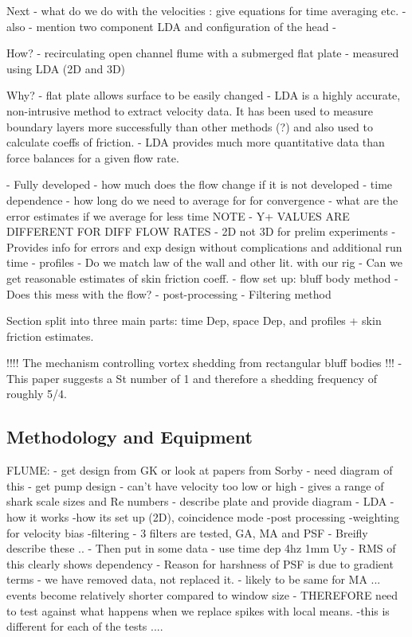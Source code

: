 \documentclass[12pt,oneside,a4paper]{article}
\begin{document}
Next - what do we do with the velocities : give equations for time averaging etc.
	-	also - mention two component LDA and configuration of the head
	-	




\vspace{2cm}

How?
	-	recirculating open channel flume with a submerged flat plate
	-	measured using LDA (2D and 3D)

Why?
	-	flat plate allows surface to be easily changed
	-	LDA is a highly accurate, non-intrusive method to extract 
		velocity data. It has been used to measure boundary layers 
		more successfully than other methods (?) and also used to 
		calculate coeffs of friction.
	-	LDA provides much more quantitative data than force balances
		for a given flow rate.



-	Fully developed
		-	how much does the flow change if it is not developed
-	time dependence
		-	how long do we need to average for for convergence
		-	what are the error estimates if we average for less time
			NOTE - Y+ VALUES ARE DIFFERENT FOR DIFF FLOW RATES
-	2D not 3D for prelim experiments
		-	Provides info for errors and exp design without 
			complications and additional run time
-	profiles
		-	Do we match law of the wall and other lit. with our rig
		-	Can we get reasonable estimates of skin friction coeff.
-	flow set up:	bluff body method
		-	Does this mess with the flow?
-	post-processing
		-	Filtering method

Section split into three main parts: time Dep, space Dep, and profiles + skin friction estimates.

!!!!	The mechanism controlling vortex shedding from rectangular bluff bodies !!! - This paper suggests a St number of 1 and therefore a shedding frequency of roughly 5/4. 

\subsection{Methodology and Equipment}
FLUME:
	-	get design from GK or look at papers from Sorby
	-	need diagram of this
	-	get pump design	
			-	can't have velocity too low or high - gives a range of shark scale sizes and Re numbers
	-	describe plate and provide diagram
	-	LDA
		-how it works
		-how its set up (2D), coincidence mode
	-post processing
		-weighting for velocity bias
		-filtering
			-	3 filters are tested, GA, MA and PSF
					-	Breifly describe these ..
					-	Then put in some data  - use time dep 4hz 1mm Uy 
							-	RMS of this clearly shows dependency
							-	Reason for harshness of PSF is due to gradient terms - we have removed data, not replaced it. 
							-	likely to be same for MA ... events become relatively shorter compared to window size 
							- THEREFORE need to test against what happens when we replace spikes with local means. 
		-this is different for each of the tests ....
\end{document}
